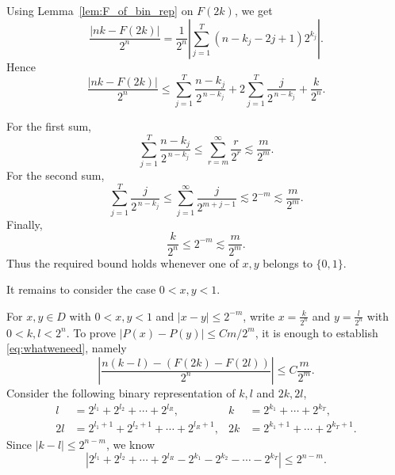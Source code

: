\documentclass[11pt]{amsart}
\theoremstyle{definition}
\renewcommand{\1}{{\mathbbm{1}}}
\begin{document}
Using Lemma~\ref{lem:F_of_bin_rep} on $F(2k)$, we get
\[
\frac{|nk-F(2k)|}{2^n}
=
\frac1{2^n}\left|
\sum_{j=1}^{T}(n-k_j-2j+1)2^{k_j}
\right|.
\]
Hence
\[
\frac{|nk-F(2k)|}{2^n}
\le
\sum_{j=1}^{T}\frac{n-k_j}{2^{\,n-k_j}}
+
2\sum_{j=1}^{T}\frac{j}{2^{\,n-k_j}}
+
\frac{k}{2^n}.
\]

For the first sum,
\[
\sum_{j=1}^{T}\frac{n-k_j}{2^{\,n-k_j}}
\le
\sum_{r=m}^{\infty}\frac{r}{2^r}
\lesssim \frac{m}{2^m}.
\]
For the second sum,
\[
\sum_{j=1}^{T}\frac{j}{2^{\,n-k_j}}
\le
\sum_{j=1}^{\infty}\frac{j}{2^{m+j-1}}
\lesssim 2^{-m}
\lesssim \frac{m}{2^m}.
\]
Finally,
\[
\frac{k}{2^n}\le 2^{-m}\lesssim \frac{m}{2^m}.
\]
Thus the required bound holds whenever one of $x,y$ belongs to $\{0,1\}$.

It remains to consider the case $0<x,y<1$.

For $x,y\in D$ with $0<x,y<1$ and $|x-y|\le 2^{-m}$, write
$x=\frac{k}{2^n}$ and $y=\frac{l}{2^n}$ with $0<k,l<2^n$. To prove
$|P(x)-P(y)|\le C m/2^m$, it is enough to establish \eqref{eq:whatweneed}, namely
\begin{equation}\label{gant01}
     \left|\frac{ n (k-l) - (F(2k) - F(2l))  }{2^n}
    \right|\leq C\frac{m}{2^{m}}.
\end{equation}
Consider the following binary representation of $k,l$ and $2k,2l$,
\begin{equation}\label{eq:binaryrep}
    \begin{aligned}
    l&=2^{l_1} + 2^{l_2} +\cdots +2^{l_R},&
    k&=2^{k_1} + \cdots +2^{k_T},\\
    2l&=2^{l_1+1} + 2^{l_2+1} +\cdots +2^{l_R+1},&
    2k&=2^{k_1+1} +\cdots +2^{k_T+1}.
\end{aligned}
\end{equation}
Since $|k-l|\leq  2^{n-m}$, we know 
\begin{equation}\label{eq:k-l}
    |2^{l_1} + 2^{l_2} +\cdots +2^{l_R} - 2^{k_1} - 2^{k_2} -\cdots -2^{k_T}| \leq 2^{n-m}.
\end{equation}
\end{document}
